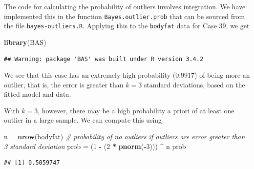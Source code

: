 \documentclass[]{book}
\newenvironment{Shaded}{\begin{snugshade}}{\end{snugshade}}
\newcommand{\KeywordTok}[1]{\textcolor[rgb]{0.13,0.29,0.53}{\textbf{#1}}}
\newcommand{\DecValTok}[1]{\textcolor[rgb]{0.00,0.00,0.81}{#1}}
\newcommand{\StringTok}[1]{\textcolor[rgb]{0.31,0.60,0.02}{#1}}
\newcommand{\CommentTok}[1]{\textcolor[rgb]{0.56,0.35,0.01}{\textit{#1}}}
\newcommand{\OperatorTok}[1]{\textcolor[rgb]{0.81,0.36,0.00}{\textbf{#1}}}
\newcommand{\NormalTok}[1]{#1}
\theoremstyle{definition}
\theoremstyle{definition}
\theoremstyle{definition}
\theoremstyle{remark}
\begin{document}
The code for calculating the probability of outliers involves
integration. We have implemented this in the function
\texttt{Bayes.outlier.prob} that can be sourced from the file
\texttt{bayes-outliers.R}. Applying this to the \texttt{bodyfat} data
for Case 39, we get

\begin{Shaded}
\begin{Highlighting}[]
\KeywordTok{library}\NormalTok{(BAS)}
\end{Highlighting}
\end{Shaded}

\begin{verbatim}
## Warning: package 'BAS' was built under R version 3.4.2
\end{verbatim}

\begin{Shaded}
\end{Shaded}

We see that this case has an extremely high probability (0.9917) of
being more an outlier, that is, the error is greater than \(k=3\)
standard deviations, based on the fitted model and data.

With \(k=3\), however, there may be a high probability a priori of at
least one outlier in a large sample. We can compute this using

\begin{Shaded}
\begin{Highlighting}[]
\NormalTok{n =}\StringTok{ }\KeywordTok{nrow}\NormalTok{(bodyfat)}
\CommentTok{# probability of no outliers if outliers are error greater than 3 standard deviation}
\NormalTok{prob =}\StringTok{ }\NormalTok{(}\DecValTok{1} \OperatorTok{-}\StringTok{ }\NormalTok{(}\DecValTok{2} \OperatorTok{*}\StringTok{ }\KeywordTok{pnorm}\NormalTok{(}\OperatorTok{-}\DecValTok{3}\NormalTok{))) }\OperatorTok{^}\StringTok{ }\NormalTok{n}
\NormalTok{prob}
\end{Highlighting}
\end{Shaded}

\begin{verbatim}
## [1] 0.5059747
\end{verbatim}
\end{document}
